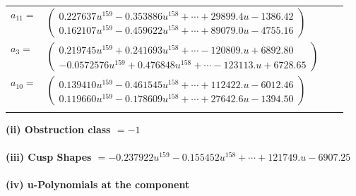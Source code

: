 \documentclass[1p]{elsarticle_modified}
\theoremstyle{definition}
\begin{document}
\begin{tabular}{m{7pt} m{180pt} m{7pt} m{180pt} }
\flushright $a_{11}=$&$\begin{pmatrix}0.227637 u^{159}-0.353886 u^{158}+\cdots+29899.4 u-1386.42\\0.162107 u^{159}-0.459622 u^{158}+\cdots+89079.0 u-4755.16\end{pmatrix}$ \\
\flushright $a_{3}=$&$\begin{pmatrix}0.219745 u^{159}+0.241693 u^{158}+\cdots-120809. u+6892.80\\-0.0572576 u^{159}+0.476848 u^{158}+\cdots-123113. u+6728.65\end{pmatrix}$ \\
\flushright $a_{10}=$&$\begin{pmatrix}0.139410 u^{159}-0.461545 u^{158}+\cdots+112422. u-6012.46\\0.119660 u^{159}-0.178609 u^{158}+\cdots+27642.6 u-1394.50\end{pmatrix}$\\&\end{tabular}
\flushleft \textbf{(ii) Obstruction class $= -1$}\\~\\
\flushleft \textbf{(iii) Cusp Shapes $= -0.237922 u^{159}-0.155452 u^{158}+\cdots+121749. u-6907.25$}\\~\\
\newpage\renewcommand{\arraystretch}{1}
\flushleft \textbf{(iv) u-Polynomials at the component}\newline \\
\end{document}
